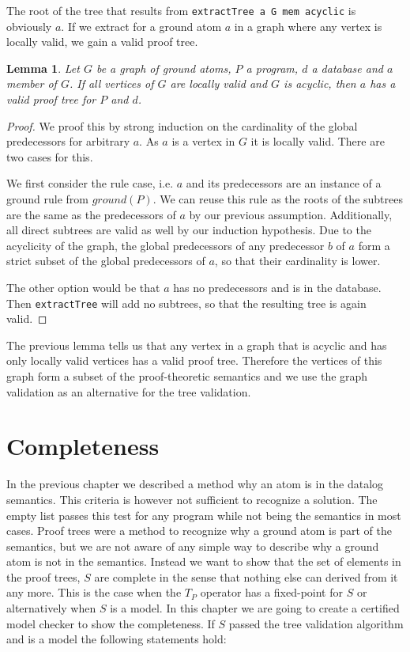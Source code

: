 \documentclass{article}
\newtheorem{lemma}{Lemma}
\begin{document}
        The root of the tree that results from \texttt{extractTree a G mem acyclic} is obviously $a$. If we extract for a ground atom $a$ in a graph where any vertex is locally valid, we gain a valid proof tree.

        \begin{lemma}
            Let $G$ be a graph of ground atoms, $P$ a program, $d$ a database and $a$ member of $G$. If all vertices of $G$ are locally valid and $G$ is acyclic, then $a$ has a valid proof tree for $P$ and $d$.
        \end{lemma}
        \begin{proof}
            We proof this by strong induction on the cardinality of the global predecessors for arbitrary $a$. As $a$ is a vertex in $G$ it is locally valid. There are two cases for this.

            We first consider the rule case, i.e. $a$ and its predecessors are an instance of a ground rule from $ground(P)$. We can reuse this rule as the roots of the subtrees are the same as the predecessors of $a$ by our previous assumption. Additionally, all direct subtrees are valid as well by our induction hypothesis. Due to the acyclicity of the graph, the global predecessors of any predecessor $b$ of $a$ form a strict subset of the global predecessors of $a$, so that their cardinality is lower.

            The other option would be that $a$ has no predecessors and is in the database. Then \texttt{extractTree} will add no subtrees, so that the resulting tree is again valid.
        \end{proof}

        The previous lemma tells us that any vertex in a graph that is acyclic and has only locally valid vertices has a valid proof tree. Therefore the vertices of this graph form a subset of the proof-theoretic semantics and we use the graph validation as an alternative for the tree validation.



        

    \section{Completeness}

    In the previous chapter we described a method why an atom is in the datalog semantics. This criteria is however not sufficient to recognize a solution. The empty list passes this test for any program while not being the semantics in most cases. Proof trees were a method to recognize why a ground atom is part of the semantics, but we are not aware of any simple way to describe why a ground atom is not in the semantics. Instead we want to show that the set of elements in the proof trees, $S$ are complete in the sense that nothing else can derived from it any more. This is the case when the $T_P$ operator has a fixed-point for $S$ or alternatively when $S$ is a model. In this chapter we are going to create a certified model checker to show the completeness. If $S$ passed the tree validation algorithm and is a model the following statements hold:
\end{document}
